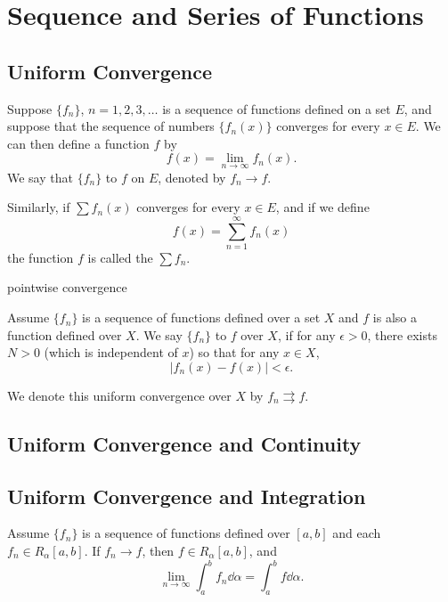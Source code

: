 \chapter{Sequence and Series of Functions}
\section{Uniform Convergence}
\begin{definition}
Suppose $\{f_n\}$, $n=1,2,3,\dots$ is a sequence of functions defined on a set $E$, and suppose that the sequence of numbers $\{f_n(x)\}$ converges for every $x\in E$. We can then define a function $f$ by
\[ f(x)=\lim_{n\to\infty}f_n(x). \]
We say that $\{f_n\}$  to $f$ on $E$, denoted by $f_n\to f$.

Similarly, if $\sum f_n(x)$ converges for every $x\in E$, and if we define
\[ f(x)=\sum_{n=1}^\infty f_n(x) \]
the function $f$ is called the  $\sum f_n$.
\end{definition}
pointwise convergence

\begin{definition}
Assume $\{f_n\}$ is a sequence of functions defined over a set $X$ and $f$ is also a function defined over $X$. We say $\{f_n\}$  to $f$ over $X$, if for any $\epsilon>0$, there exists $N>0$ (which is independent of $x$) so that for any $x\in X$,
\[ |f_n(x)-f(x)|<\epsilon. \]
\end{definition}

\begin{notation}
We denote this uniform convergence over $X$ by $f_n\rightrightarrows f$.
\end{notation}

\section{Uniform Convergence and Continuity}

\section{Uniform Convergence and Integration}
\begin{theorem}
Assume $\{f_n\}$ is a sequence of functions defined over $[a,b]$ and each $f_n\in R_\alpha[a,b]$. If $f_n\to f$, then $f\in R_\alpha[a,b]$, and
\[ \lim_{n\to\infty}\int_a^bf_n\dd{\alpha}=\int_a^bf\dd{\alpha}. \]
\end{theorem}

